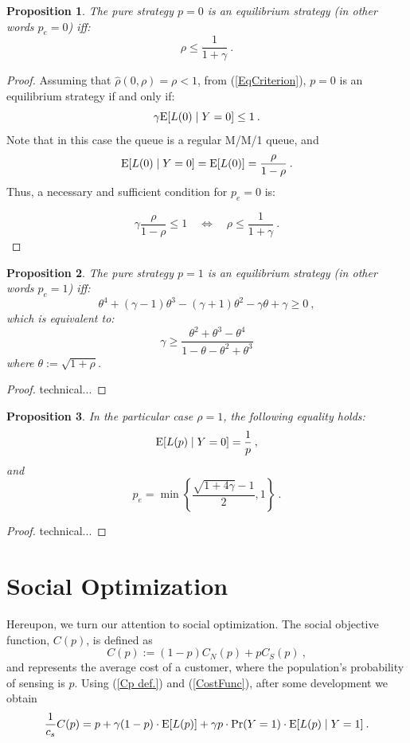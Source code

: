 \documentclass[11pt]{article}
\numberwithin{equation}{section}
\newtheorem{proposition}{Proposition}[section]
\newcommand{\e}{{\rm E}}
\begin{document}
\begin{proposition}
The pure strategy $p=0$ is an equilibrium strategy (in other words $p_e=0$) iff:
\[ \rho \leq \frac{1}{1+\gamma} \:.\]
\label{p_e=0 condition}
\end{proposition}
\begin{proof}
Assuming that $\hat{\rho}(0,\rho) = \rho < 1$, from (\ref{EqCriterion}), $p=0$ is an equilibrium strategy if and only if:
\[ \gamma \e[L(0)\mid Y=0] \leq 1 \:.\]
Note that in this case the queue is a regular M/M/1 queue, and 
\[ \e[L(0)\mid Y=0] = \e[L(0)] = \frac{\rho}{1-\rho} \:.\] 
Thus, a necessary and sufficient condition for $p_{e}=0$ is:

\[ \gamma \frac{\rho}{1-\rho} \leq 1 \quad\Leftrightarrow\quad \rho \leq \frac{1}{1+\gamma} \:.\]
\end{proof}

\begin{proposition}
The pure strategy $p=1$ is an equilibrium strategy (in other words $p_e=1$) iff:
\[ \theta^4 + (\gamma-1)\theta^3 - (\gamma+1)\theta^2 - \gamma\theta + \gamma \geq 0 \:,\]
which is equivalent to:
\[ \gamma \geq \frac{\theta^2 + \theta^3 - \theta^4}{1- \theta - \theta^2 + \theta^3} \] 
where $\theta := \sqrt{1+\rho}$. \label{p_e=1 condition}
\end{proposition}
\begin{proof}
technical...
\end{proof}

\begin{proposition}
In the particular case $\rho=1$, the following equality holds:
\[ \e[L(p) \mid Y=0] = \frac{1}{p} \:,\]
and
\[ p_e = \min\left\lbrace\frac{\sqrt{1+4\gamma}-1}{2}, 1\right\rbrace \:.\]
\end{proposition}
\begin{proof}
technical...
\end{proof}

\newpage
\section{Social Optimization}

Hereupon, we turn our attention to social optimization. The social objective function, $C(p)$, is defined as 
\begin{equation}
C(p) := (1-p)C_N(p)+pC_S(p) \:, \label{Cp def.}
\end{equation}
and represents the average cost of a customer, where the population's probability of sensing is $p$. Using (\ref{Cp def.}) and (\ref{CostFunc}), after some development we obtain
\begin{equation}
\frac{1}{c_s}C(p) = p + \gamma (1-p) \cdot \e[L(p)] + \gamma p \cdot \Pr(Y=1) \cdot \e[L(p) \mid Y=1] \:. \label{Cp/cs}
\end{equation}
\end{document}
